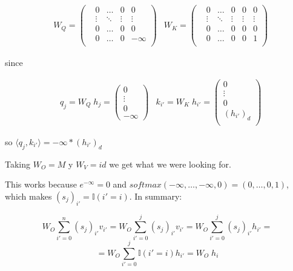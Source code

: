 \begin{align*}
    & W_Q = \left(\begin{matrix}
    &0      &\hdots &0      &0          \\
    &\vdots &\ddots &\vdots &\vdots     \\
    &0      &\hdots &0      &0          \\
    &0      &\hdots &0      &-\infty    \\
\end{matrix}\right)
    &W_K = \left(\begin{matrix}
    &0      &\hdots &0      &0      &0      \\
    &\vdots &\ddots &\vdots &\vdots &\vdots \\
    &0      &\hdots &0      &0      &0      \\
    &0      &\hdots &0      &0      &1      \\
\end{matrix}\right)
\end{align*}


since


\begin{align*}
    &q_{j} = W_Q \; h_j = \left(\begin{matrix}
        0 \\
        \vdots \\
        0 \\
        -\infty
    \end{matrix}\right)
    &k_{i'} = W_K \; h_{i'} = \left(\begin{matrix}
        0 \\
        \vdots \\
        0 \\
        (h_{i'})_{d} \\
    \end{matrix}\right)
\end{align*}

so $\langle q_{j}, k_{i'} \rangle = -\infty *(h_{i'})_{d}$

\bigskip

Taking $W_O = M$ y $W_V = id$ we get what we were looking for. 

This works because $e^{-\infty} = 0$ and $softmax(-\infty, \dots, -\infty, 0) = (0, \dots, 0, 1)$, which makes $(s_j)_{i'} = \mathbb{I}(i' = i)$. In summary:

\[
  W_O \sum_{i'=0}^{n} (s_j)_{i'} v_{i'} = 
  W_O \sum_{i'=0}^{j} (s_j)_{i'} v_{i'} = 
  W_O \sum_{i'=0}^{j} (s_j)_{i'} h_{i'} = \]\[ =
  W_O \sum_{i'=0}^{j} \mathbb{I}(i' = i) h_{i'} = 
  W_O \; h_i
\]


